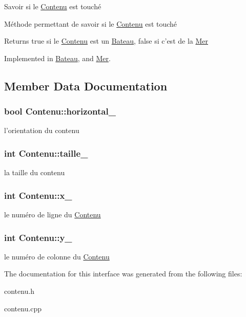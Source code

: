 Savoir si le \hyperlink{classContenu}{Contenu} est touché 

Méthode permettant de savoir si le \hyperlink{classContenu}{Contenu} est touché

\begin{DoxyReturn}{Returns}
true si le \hyperlink{classContenu}{Contenu} est un \hyperlink{classBateau}{Bateau}, false si c'est de la \hyperlink{classMer}{Mer} 
\end{DoxyReturn}


Implemented in \hyperlink{classBateau_a8fff831d5081544b0abbf5b6816ebe35}{Bateau}, and \hyperlink{classMer_a2ec6ecba14a8f737335720f3dffe9877}{Mer}.



\subsection{Member Data Documentation}
\hypertarget{classContenu_a7512c8fe29c284d31c24bfe03a6b2684}{
\subsubsection[{horizontal\+\_\+}]{\setlength{\rightskip}{0pt plus 5cm}bool Contenu\+::horizontal\+\_\+\hspace{0.3cm}{\ttfamily [protected]}}}\label{classContenu_a7512c8fe29c284d31c24bfe03a6b2684}
l'orientation du contenu \hypertarget{classContenu_a354281d1fa2b2e8e39ee84c56115a7f5}{
\subsubsection[{taille\+\_\+}]{\setlength{\rightskip}{0pt plus 5cm}int Contenu\+::taille\+\_\+\hspace{0.3cm}{\ttfamily [protected]}}}\label{classContenu_a354281d1fa2b2e8e39ee84c56115a7f5}
la taille du contenu \hypertarget{classContenu_a181b4b730433d5f2775d0c19cadd4132}{
\subsubsection[{x\+\_\+}]{\setlength{\rightskip}{0pt plus 5cm}int Contenu\+::x\+\_\+\hspace{0.3cm}{\ttfamily [protected]}}}\label{classContenu_a181b4b730433d5f2775d0c19cadd4132}
le numéro de ligne du \hyperlink{classContenu}{Contenu} \hypertarget{classContenu_a571f1aa960aaaa1971bfefe70326457d}{
\subsubsection[{y\+\_\+}]{\setlength{\rightskip}{0pt plus 5cm}int Contenu\+::y\+\_\+\hspace{0.3cm}{\ttfamily [protected]}}}\label{classContenu_a571f1aa960aaaa1971bfefe70326457d}
le numéro de colonne du \hyperlink{classContenu}{Contenu} 

The documentation for this interface was generated from the following files\+:\begin{DoxyCompactItemize}
\item 
contenu.\+h\item 
contenu.\+cpp\end{DoxyCompactItemize}

